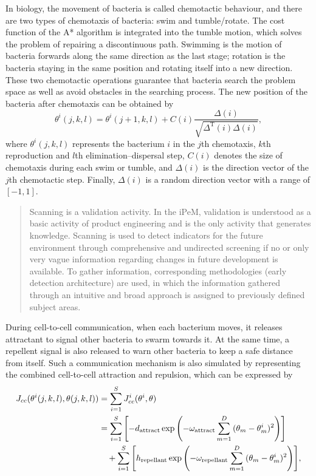 \documentclass{PDS}%
\theoremstyle{definition}
\begin{document}

In biology, the movement of bacteria is called chemotactic behaviour, and there are two
types of chemotaxis of bacteria: swim and tumble/rotate. The cost function of the A* algorithm is integrated into the tumble motion, which
solves the problem of repairing a discontinuous path. Swimming is the motion of bacteria forwards along the same direction as the last stage; rotation is the bacteria staying in the
same position and rotating itself into a new direction. These two chemotactic operations
guarantee that bacteria search the problem space as well as avoid obstacles in the
searching process. The new position of the bacteria after chemotaxis can be obtained by
\begin{equation}\label{equ:1}
\theta^i(j, k, l)=\theta^i(j+1, k, l)+ C(i)\frac{{\Delta ( i )}}
{{\sqrt {\Delta^\text{T} (i)\Delta ( i )} }},
\end{equation}
where $\theta^i(j, k, l)$ represents the bacterium $i$ in the $j$th chemotaxis, $k$th
reproduction and $l$th elimination--dispersal step, $C(i)$ denotes the size of chemotaxis
during each swim or tumble, and $\Delta (i)$ is the direction vector of the $j$th
chemotactic step. Finally, $\Delta (i)$ is a random direction vector with a range of $[-1, 1]$.
\begin{quote}
Scanning is a validation activity. In the iPeM, validation is understood as a basic
activity of product engineering and is the only activity that generates knowledge.
Scanning is used to detect indicators for the future environment through comprehensive
and undirected screening if no or only very vague information regarding changes in
future development is available. To gather information, corresponding methodologies
(early detection architecture) are used, in which the information gathered through an
intuitive and broad approach is assigned to previously defined subject areas.
\end{quote}
During cell-to-cell communication, when each bacterium moves, it releases attractant
to signal other bacteria to swarm towards it. At the same time, a repellent signal is
also released to warn other bacteria to keep a safe distance from itself. Such a
communication mechanism is also simulated by representing the combined cell-to-cell
attraction and repulsion, which can be expressed by
\begin{align}
J_{cc} (\theta^i(j, k, l) ,\theta(j, k, l)) &= \sum_{i = 1}^S {J_{cc}^i (\theta^i,\theta)}\notag\\
&= \sum_{i = 1}^S {\left[ - d_{\text{attract}} \exp \left( - \omega_{\text{attract}} \sum_{m =
1}^D {(\theta_m - \theta_m^i )^2 } \right)\right]}\notag\\
&\quad +\sum_{i = 1}^S {\left[h_{\text{repellant}} \exp \left( - \omega_{\text{repellant}} \sum_{m =
1}^D {(\theta_m - \theta_m^i )^2 } \right)\right]},
\label{equ:2}
\end{align}
\end{document}
